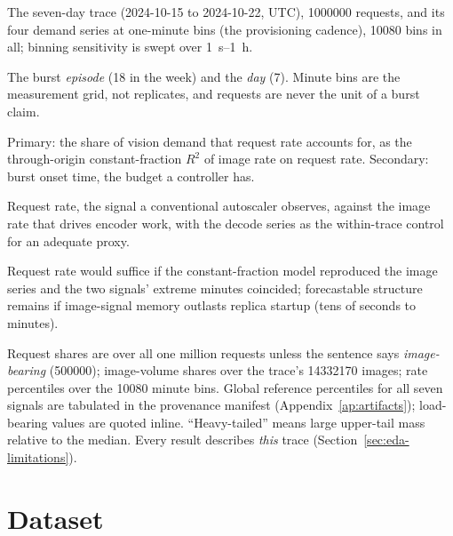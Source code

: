 \begin{description}
\setlength{\itemsep}{0pt}\setlength{\parskip}{0pt}
\item[Population.] The seven-day trace (2024-10-15 to 2024-10-22, UTC),
\num{1000000} requests, and its four demand series at one-minute bins (the
provisioning cadence), \num{10080} bins in all; binning sensitivity is swept
over \SI{1}{\second}--\SI{1}{\hour}.
\item[Independent unit.] The burst \emph{episode} (18 in the week) and the
\emph{day} (7). Minute bins are the measurement grid, not replicates, and
requests are never the unit of a burst claim.
\item[Endpoints.] Primary: the share of vision demand that request rate
accounts for, as the through-origin constant-fraction $R^2$ of image rate on request
rate. Secondary: burst onset time, the budget a controller has.
\item[Comparator.] Request rate, the signal a conventional autoscaler observes,
against the image rate that drives encoder work, with the decode series as the
within-trace control for an adequate proxy.
\item[Adequacy criterion.] Request rate would suffice if the constant-fraction
model reproduced the image series and the two signals' extreme minutes
coincided; forecastable structure remains if image-signal memory outlasts
replica startup (tens of seconds to minutes).
\item[Denominators and scope.] Request shares are over all one million requests
unless the sentence says \emph{image-bearing} (\num{500000}); image-volume
shares over the trace's \num{14332170} images; rate percentiles over the
\num{10080} minute bins. Global reference percentiles for all seven signals are
tabulated in the provenance manifest (Appendix~\ref{ap:artifacts});
load-bearing values are quoted inline. ``Heavy-tailed'' means large upper-tail
mass relative to the median. Every result describes \emph{this} trace
(Section~\ref{sec:eda-limitations}).
\end{description}

\section{Dataset}
\label{sec:eda-dataset}

